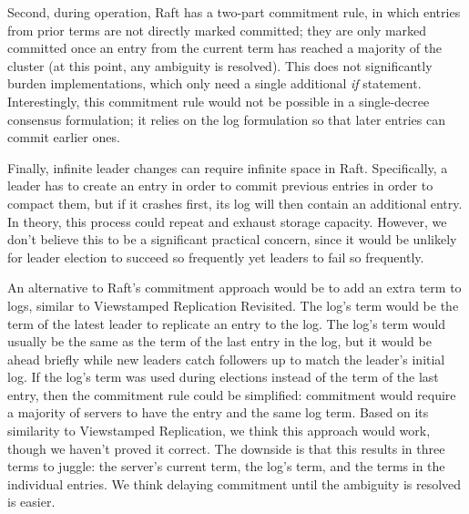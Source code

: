 Second, during operation, Raft has a two-part commitment rule, in which
entries from prior terms are not directly marked committed; they are
only marked committed once an entry from the current term has reached a
majority of the cluster (at this point, any ambiguity is resolved). This
does not significantly burden implementations, which only need a single
additional \emph{if} statement. Interestingly, this commitment rule
would not be possible in a single-decree consensus formulation; it
relies on the log formulation so that later entries can commit earlier
ones.

Finally, infinite leader changes can require infinite space in Raft.
Specifically, a leader has to create an entry in order to commit
previous entries in order to compact them, but if it crashes first, its
log will then contain an additional entry. In theory, this process could repeat
and exhaust storage capacity. However, we don't believe this to be a
significant practical concern, since it would be unlikely for leader
election to succeed so frequently yet leaders to fail so frequently.

An alternative to Raft's commitment approach would be to add an extra
term to logs, similar to Viewstamped Replication Revisited. The log's
term would be the term of the latest leader to replicate an entry to the
log. The log's term would usually be the same as the term of the last
entry in the log, but it would be ahead briefly while new leaders catch
followers up to match the leader's initial log. If the log's term was
used during elections instead of the term of the last entry, then the
commitment rule could be simplified: commitment would require a majority
of servers to have the entry and the same log term. Based on its
similarity to Viewstamped Replication, we think this approach would
work, though we haven't proved it correct. The downside is that this
results in three terms to juggle: the server's current term, the
log's term, and the terms in the individual entries. We think delaying
commitment until the ambiguity is resolved is easier.
